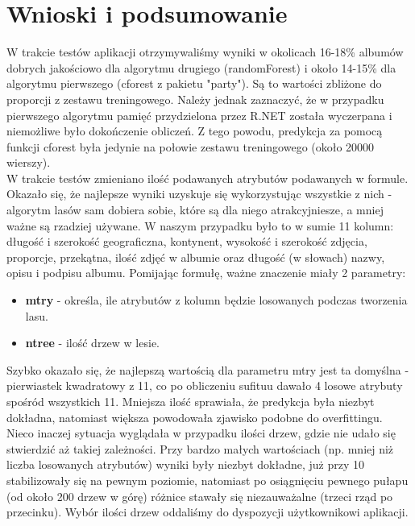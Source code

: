 \documentclass[a4paper,twoside]{article}
\begin{document}
\section{Wnioski i podsumowanie}

W trakcie testów aplikacji otrzymywaliśmy wyniki w okolicach 16-18\% albumów dobrych jakościowo dla algorytmu drugiego (randomForest) i około 14-15\% dla algorytmu pierwszego (cforest z pakietu "party"). Są to wartości zbliżone do proporcji z zestawu treningowego. Należy jednak zaznaczyć, że w przypadku pierwszego algorytmu pamięć przydzielona przez R.NET została wyczerpana i niemożliwe było dokończenie obliczeń. Z tego powodu, predykcja za pomocą funkcji cforest była jedynie na połowie zestawu treningowego (około 20000 wierszy). \\

W trakcie testów zmieniano ilość podawanych atrybutów podawanych w formule. Okazało się, że najlepsze wyniki uzyskuje się wykorzystując wszystkie z nich - algorytm lasów sam dobiera sobie, które są dla niego atrakcyjniesze, a mniej ważne są rzadziej używane. W naszym przypadku było to w sumie 11 kolumn: długość i szerokość geograficzna, kontynent, wysokość i szerokość zdjęcia, proporcje, przekątna, ilość zdjęć w albumie oraz długość (w słowach) nazwy, opisu i podpisu albumu. Pomijając formułę, ważne znaczenie miały 2 parametry:

\begin{itemize}
	\item \textbf{mtry} - określa, ile atrybutów z kolumn będzie losowanych podczas tworzenia lasu.
	\item \textbf{ntree} - ilość drzew w lesie.
\end{itemize}

Szybko okazało się, że najlepszą wartością dla parametru mtry jest ta domyślna - pierwiastek kwadratowy z 11, co po obliczeniu sufituu dawało 4 losowe atrybuty spośród wszystkich 11. Mniejsza ilość sprawiała, że predykcja była niezbyt dokładna, natomiast większa powodowała zjawisko podobne do overfittingu. Nieco inaczej sytuacja wyglądała w przypadku ilości drzew, gdzie nie udało się stwierdzić aż takiej zależności.  Przy bardzo małych wartościach (np. mniej niż liczba losowanych atrybutów) wyniki były niezbyt dokładne, już przy 10 stabilizowały się na pewnym poziomie, natomiast po osiągnięciu pewnego pułapu (od około 200 drzew w górę) różnice stawały się niezauważalne (trzeci rząd po przecinku). Wybór ilości drzew oddaliśmy do dyspozycji użytkownikowi aplikacji.\\
\end{document}
